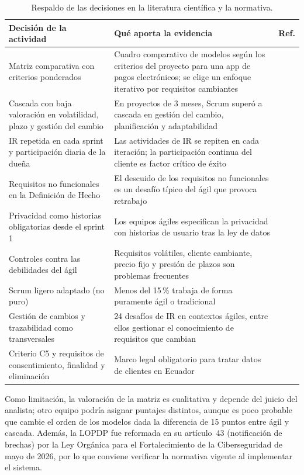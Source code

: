 \documentclass[11pt,a4paper]{article}
\begin{document}
\begin{table}[htbp]
\centering
\caption{Respaldo de las decisiones en la literatura científica y la normativa.}
\label{tab:respaldo}
\footnotesize
\begin{tabularx}{\textwidth}{@{}P{4.3cm}LC{1.3cm}@{}}
\toprule
\textbf{Decisión de la actividad} & \textbf{Qué aporta la evidencia} & \textbf{Ref.} \\
\midrule
Matriz comparativa con criterios ponderados & Cuadro comparativo de modelos según los criterios del proyecto para una app de pagos electrónicos; se elige un enfoque iterativo por requisitos cambiantes & \cite{otavo2024} \\
Cascada con baja valoración en volatilidad, plazo y gestión del cambio & En proyectos de 3 meses, Scrum superó a cascada en gestión del cambio, planificación y adaptabilidad & \cite{mex2025} \\
IR repetida en cada sprint y participación diaria de la dueña & Las actividades de IR se repiten en cada iteración; la participación continua del cliente es factor crítico de éxito & \cite{schon2017} \\
Requisitos no funcionales en la Definición de Hecho & El descuido de los requisitos no funcionales es un desafío típico del ágil que provoca retrabajo & \cite{schon2017} \\
Privacidad como historias obligatorias desde el sprint 1 & Los equipos ágiles especifican la privacidad con historias de usuario tras la ley de datos & \cite{canedo2022} \\
Controles contra las debilidades del ágil & Requisitos volátiles, cliente cambiante, precio fijo y presión de plazos son problemas frecuentes & \cite{meckenstock2024} \\
Scrum ligero adaptado (no puro) & Menos del 15\,\% trabaja de forma puramente ágil o tradicional & \cite{kuhrmann2022} \\
Gestión de cambios y trazabilidad como transversales & 24 desafíos de IR en contextos ágiles, entre ellos gestionar el conocimiento de requisitos que cambian & \cite{kasauli2021} \\
Criterio C5 y requisitos de consentimiento, finalidad y eliminación & Marco legal obligatorio para tratar datos de clientes en Ecuador & \cite{lopdp2021,reglamento2023} \\
\bottomrule
\end{tabularx}
\end{table}

Como limitación, la valoración de la matriz es cualitativa y depende del
juicio del analista; otro equipo podría asignar puntajes distintos, aunque es
poco probable que cambie el orden de los modelos dada la diferencia de 15
puntos entre ágil y cascada. Además, la LOPDP fue reformada en su
artículo~43 (notificación de brechas) por la Ley Orgánica para el
Fortalecimiento de la Ciberseguridad de mayo de 2026, por lo que conviene
verificar la normativa vigente al implementar el sistema.
\end{document}
